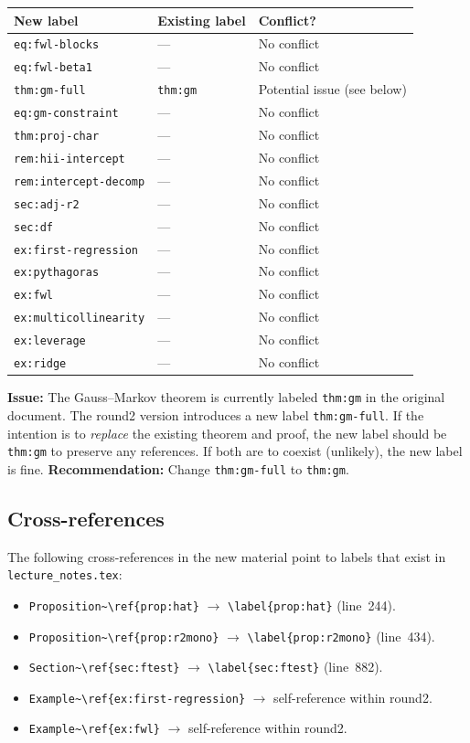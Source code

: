 \begin{center}
\renewcommand{\arraystretch}{1.1}
\begin{tabular}{lll}
\toprule
New label & Existing label & Conflict? \\
\midrule
\verb|eq:fwl-blocks| & --- & No conflict \\
\verb|eq:fwl-beta1| & --- & No conflict \\
\verb|thm:gm-full| & \verb|thm:gm| & Potential issue (see below) \\
\verb|eq:gm-constraint| & --- & No conflict \\
\verb|thm:proj-char| & --- & No conflict \\
\verb|rem:hii-intercept| & --- & No conflict \\
\verb|rem:intercept-decomp| & --- & No conflict \\
\verb|sec:adj-r2| & --- & No conflict \\
\verb|sec:df| & --- & No conflict \\
\verb|ex:first-regression| & --- & No conflict \\
\verb|ex:pythagoras| & --- & No conflict \\
\verb|ex:fwl| & --- & No conflict \\
\verb|ex:multicollinearity| & --- & No conflict \\
\verb|ex:leverage| & --- & No conflict \\
\verb|ex:ridge| & --- & No conflict \\
\bottomrule
\end{tabular}
\end{center}

\noindent\textbf{Issue:} The Gauss--Markov theorem is currently labeled
\verb|thm:gm| in the original document.  The round2 version introduces a
new label \verb|thm:gm-full|.  If the intention is to \emph{replace} the
existing theorem and proof, the new label should be \verb|thm:gm| to
preserve any references.  If both are to coexist (unlikely), the new
label is fine.  \textbf{Recommendation:} Change \verb|thm:gm-full| to
\verb|thm:gm|.


\subsection*{Cross-references}

The following cross-references in the new material point to labels that
exist in \texttt{lecture\_notes.tex}:

\begin{itemize}[nosep]
  \item \verb|Proposition~\ref{prop:hat}| $\to$ \verb|\label{prop:hat}| (line~244). \checkmark
  \item \verb|Proposition~\ref{prop:r2mono}| $\to$ \verb|\label{prop:r2mono}| (line~434). \checkmark
  \item \verb|Section~\ref{sec:ftest}| $\to$ \verb|\label{sec:ftest}| (line~882). \checkmark
  \item \verb|Example~\ref{ex:first-regression}| $\to$ self-reference within round2. \checkmark
  \item \verb|Example~\ref{ex:fwl}| $\to$ self-reference within round2. \checkmark
\end{itemize}

